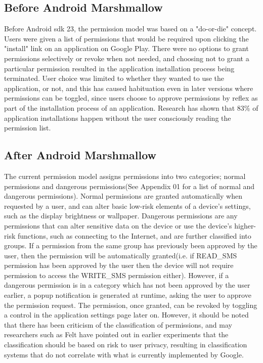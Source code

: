 \subsection{Before Android Marshmallow}
Before Android sdk 23, the permission model was based on a "do-or-die" concept. Users were given a list of permissions that would be required upon clicking the "install" link on an application on Google Play. There were no options to grant permissions selectively or revoke when not needed, and choosing not to grant a particular permission resulted in the application installation process being terminated\cite{felt2011effectiveness}. User choice was limited to whether they wanted to use the application, or not, and this has caused habituation even in later versions where permissions can be toggled\cite{wijesekera2015android}, since users choose to approve permissions by reflex as part of the installation process of an application. Research has shown that 83\% of application installations happen without the user consciously reading the permission list\cite{felt2012android}. 
 
\subsection{After Android Marshmallow}
The current permission model assigns permissions into two categories; normal permissions and dangerous permissions(See Appendix 01 for a list of normal and dangerous permissions). Normal permissions are granted automatically when requested by a user, and can alter basic low-risk elements of a device's settings, such as the display brightness or wallpaper. Dangerous permissions are any permissions that can alter sensitive data on the device or use the device's higher-risk functions, such as connecting to the Internet, and are further classified into groups. If a permission from the same group has previously been approved by the user, then the permission will be automatically granted(i.e. if READ\_SMS permission has been approved by the user then the device will not require permission to access the WRITE\_SMS permission either). However, if a dangerous permission is in a category which has not been approved by the user earlier, a popup notification is generated at runtime, asking the user to approve the permission request. The permission, once granted, can be revoked by toggling a control in the application settings page later on. However, it should be noted that there has been criticism of the classification of permissions, and may researchers such as Felt have pointed out in earlier experiments that the classification should be based on risk to user privacy\cite{felt2011android}, resulting in classification systems that do not correlate with what is currently implemented by Google\cite{androidyearinreview}. 

